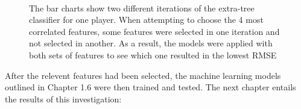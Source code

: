 \documentclass[a4paper,11pt,twoside]{article}
\begin{document}
\begin{figure} [h!]
 \captionsetup{justification=centering}
\\
\caption{The bar charts show two different iterations of the extra-tree classifier for one player. When attempting to choose the 4 most correlated features, some features were selected in one iteration and not selected in another. As a result, the models were applied with both sets of features to see which one resulted in the lowest RMSE}
\end{figure}

After the relevent features had been selected, the machine learning models outlined in Chapter 1.6 were then trained and tested. The next chapter entails the results of this investigation:
\end{document}
